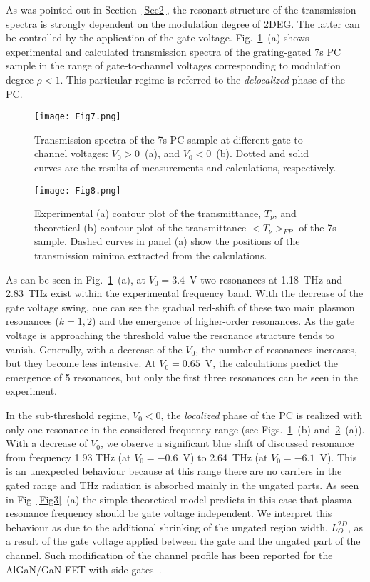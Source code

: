 \documentclass[%
 reprint,
 amsmath,amssymb,
 aps,
]{revtex4-2}
\begin{document}
As was pointed out in Section~\ref{Sec2}, the resonant structure of the transmission spectra is strongly dependent on the modulation degree of 2DEG. The latter can be controlled by the application of the gate voltage.   
Fig.~\ref{Fig7}~(a) shows experimental and calculated transmission spectra of the grating-gated 7s PC sample in the range of gate-to-channel voltages corresponding to modulation degree $\rho < 1$. 
This particular regime is referred to the \textit{ delocalized} phase of the PC.

\begin{figure}[t!!!]
\texttt{[image: Fig7.png]}
\caption{\label{Fig7} Transmission spectra of the 7s PC sample at different gate-to-channel voltages: $V_0 > 0$~(a), and $V_0 < 0$~(b). Dotted and solid curves are the results of measurements and calculations, respectively.}
\end{figure}

\begin{figure}[t!!!]
\texttt{[image: Fig8.png]}
\caption{Experimental (a) contour plot of the transmittance, $T_{\nu}$, and theoretical (b) contour plot of the transmittance $<T_{\nu}>_{FP}$ of the 7s sample. Dashed curves in panel (a) show the positions of the transmission minima extracted from the calculations.}
\label{Fig8}
\end{figure}


As can be seen in Fig.~\ref{Fig7}~(a), at $V_0 = 3.4$~V two resonances at 1.18~THz and 2.83~THz exist within the experimental frequency band. With the decrease of the gate voltage swing, one can see the gradual red-shift of these two main plasmon resonances ($k = 1, 2$) and the emergence of higher-order resonances. As the gate voltage is approaching the threshold value the resonance structure tends to vanish.
Generally, with a decrease of the $V_0$, the number of resonances increases, but they become less intensive. At $V_0 = 0.65$~V, the calculations predict the emergence of 5 resonances, but only the first three resonances can be seen in the experiment. 

In the sub-threshold regime, $V_0 < 0$, the \textit{localized} phase of the PC is realized with only one resonance in the considered frequency range (see Figs.~\ref{Fig7}~(b) and~\ref{Fig8}~(a)).
With a decrease of $V_0$, we observe a significant blue shift of discussed resonance from frequency 1.93 THz (at $V_0 = -0.6$~V) to 2.64~THz (at $V_0 = -6.1$~V). 
This is an unexpected behaviour because at this range there are no carriers in the gated range and THz radiation is absorbed mainly in the ungated parts. As seen in Fig~\ref{Fig3}~(a) the simple theoretical model predicts in this case that plasma resonance frequency should be gate voltage independent.
We interpret this behaviour as due to the additional shrinking of the ungated region width, $L^{2D}_{O}$, as a result of the gate voltage applied between the gate and the ungated part of the channel. 
Such modification of the channel profile has been reported for the AlGaN/GaN FET with side gates~\cite{cywinski2018, sai2019algan}.
\end{document}
